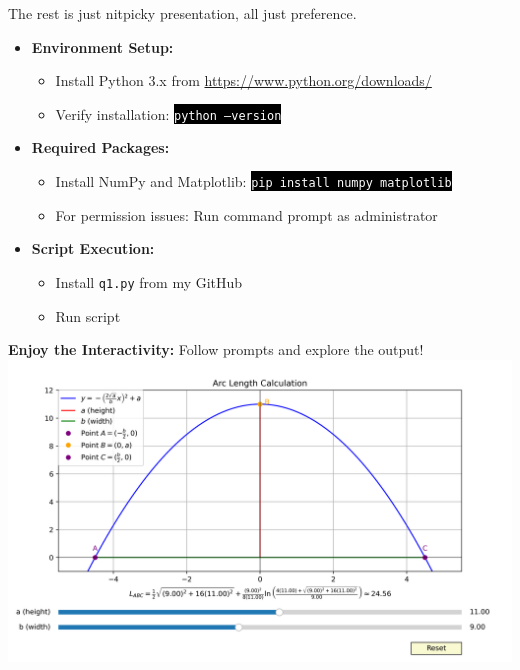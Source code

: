 \documentclass[a4paper, 12pt]{report}
\begin{document}
    The rest is just nitpicky presentation, all just preference.
    
    \centering
    

\begin{itemize}[itemsep=-0.1cm]
    \item \textbf{Environment Setup:}
    \begin{itemize}[itemsep=-0.1cm]
        \item Install Python 3.x from \url{https://www.python.org/downloads/}
        \item Verify installation: \mbox{\colorbox{black}{\textcolor{white}{\texttt{python --version}}}}
    \end{itemize}
    
    \item \textbf{Required Packages:}
    \begin{itemize}[itemsep=-0.1cm]
        \item Install NumPy and Matplotlib: \mbox{\colorbox{black}{\textcolor{white}{\texttt{pip install numpy matplotlib}}}}
        \item For permission issues: Run command prompt as administrator
    \end{itemize}
    
    \item \textbf{Script Execution:}
    \begin{itemize}[itemsep=-0.1cm]
        \item Install \texttt{q1.py} from my GitHub
    \item Run script
    \end{itemize}

    \end{itemize}
    
     \textbf{Enjoy the Interactivity:} Follow prompts and explore the output!
    \includegraphics[scale=0.7]{Figure_1.png}
    
\end{document}
